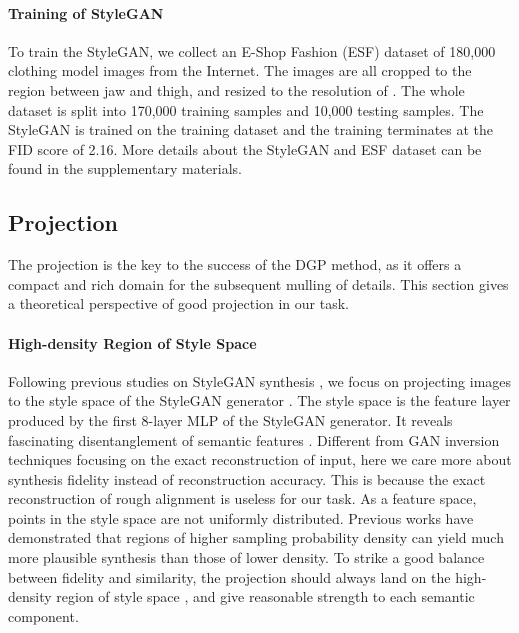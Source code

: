 \documentclass[10pt,twocolumn,letterpaper]{article}
\begin{document}
\paragraph{Training of StyleGAN} To train the StyleGAN, we collect an E-Shop Fashion (ESF) dataset of 180,000 clothing model images from the Internet. The images are all cropped to the region between jaw and thigh, and resized to the resolution of . The whole dataset is split into 170,000 training samples and 10,000 testing samples. The StyleGAN is trained on the training dataset and the training terminates at the FID score of 2.16. More details about the StyleGAN and ESF dataset can be found in the supplementary materials.

\subsection{Projection}\label{sec:projection}
The projection is the key to the success of the DGP method, as it offers a compact and rich domain for the subsequent mulling of details. This section gives a theoretical perspective of good projection in our task.

\paragraph{High-density Region of Style Space} Following previous studies on StyleGAN synthesis \cite{shen2020interpreting,tewari2020stylerig,abdal2019image2stylegan}, we focus on projecting images to the style space  of the StyleGAN generator . The style space  is the feature layer produced by the first 8-layer MLP of the StyleGAN generator. It reveals fascinating disentanglement of semantic features \cite{shen2020interpreting,karras2020analyzing}. Different from GAN inversion \cite{richardson2021encoding,abdal2019image2stylegan,abdal2020image2stylegan++, tov2021designing} techniques focusing on the exact reconstruction of input, here we care more about synthesis fidelity instead of reconstruction accuracy. This is because the exact reconstruction of rough alignment is useless for our task. As a feature space, points in the style space  are not uniformly distributed. Previous works \cite{shen2020interpreting,abdal2019image2stylegan,karras2020analyzing} have demonstrated that regions of higher sampling probability density can yield much more plausible synthesis than those of lower density. To strike a good balance between fidelity and similarity, the projection should always land on the high-density region of style space , and give reasonable strength to each semantic component. 
\end{document}
